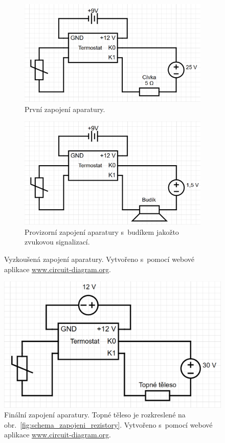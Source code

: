 \documentclass[12pt]{article}
\begin{document}
\begin{figure}[h!]
    \begin{subfigure}[b]{.5\textwidth}
        \includegraphics[width = \textwidth]{figures/zapojeni_1.png}
        \caption{První zapojení aparatury.}
    \end{subfigure}
    \hfill
    \begin{subfigure}[b]{.5\textwidth}
        \includegraphics[width = \textwidth]{figures/zapojeni_2.png}
        \caption{Provizorní zapojení aparatury s~budíkem jakožto zvukovou signalizací.}
    \end{subfigure}
    \caption{Vyzkoušená zapojení aparatury. Vytvořeno s~pomocí webové aplikace \url{www.circuit-diagram.org}.}
    \label{fig:zapojeni_prvni}
\end{figure}

\begin{figure}[h!]
    \centering
    \includegraphics[width = 0.5\linewidth]{figures/zapojeni_3.png}
    \caption{Finální zapojení aparatury. Topné těleso je rozkreslené na obr.~\ref{fig:schema_zapojeni_rezistory}. Vytvořeno s~pomocí webové aplikace \url{www.circuit-diagram.org}.}
    \label{fig:zapojeni_final}
\end{figure}
\end{document}
